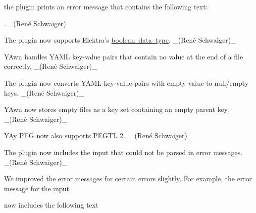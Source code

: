 \begin{DoxyCode}{0}
\end{DoxyCode}


the plugin prints an error message that contains the following text\+:


\begin{DoxyCode}{0}
\DoxyCodeLine{                   \string^}
\end{DoxyCode}


. \+\_\+(René Schwaiger)\+\_\+


\begin{DoxyItemize}
\item The plugin now supports Elektra’s \mbox{\hyperlink{doc_decisions_boolean_md}{boolean data type}}. \+\_\+(René Schwaiger)\+\_\+
\item Y\+Awn handles Y\+A\+ML key-\/value pairs that contain no value at the end of a file correctly. \+\_\+(René Schwaiger)\+\_\+
\item The plugin now converts Y\+A\+ML key-\/value pairs with empty value to null/empty keys. \+\_\+(René Schwaiger)\+\_\+
\item Y\+Awn now stores empty files as a key set containing an empty parent key. \+\_\+(René Schwaiger)\+\_\+
\end{DoxyItemize}


\begin{DoxyItemize}
\item Y\+Ay P\+EG now also supports P\+E\+G\+TL 2.. \+\_\+(René Schwaiger)\+\_\+
\item The plugin now includes the input that could not be parsed in error messages. \+\_\+(René Schwaiger)\+\_\+
\item We improved the error messages for certain errors slightly. For example, the error message for the input
\end{DoxyItemize}


\begin{DoxyCode}{0}
\end{DoxyCode}


now includes the following text


\begin{DoxyCode}{0}
\DoxyCodeLine{                    \string^}
\end{DoxyCode}


